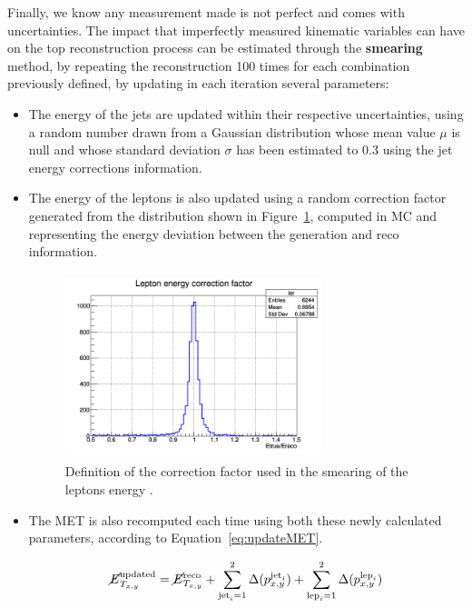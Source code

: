 \documentclass[a4paper, 10pt, openright]{report}
\begin{document}
Finally, we know any measurement made is not perfect and comes with uncertainties. The impact that imperfectly measured kinematic variables can have on the top reconstruction process can be estimated through the \textbf{smearing} method, by repeating the reconstruction 100 times for each combination previously defined, by updating in each iteration several parameters:
\begin{itemize}
\item The energy of the jets are updated within their respective uncertainties, using a random number drawn from a Gaussian distribution whose mean value $\mu$ is null and whose standard deviation $\sigma$ has been estimated to 0.3 using the jet energy corrections information.

\item The energy of the leptons is also updated using a random correction factor generated from the distribution shown in Figure~\ref{fig:lepsmearing}, computed in \ac{MC} and representing the energy deviation between the generation and reco information.

\begin{figure}[htbp]
\centering
\includegraphics[width=7.5cm, height=5.4cm]{figs/ler.png}
\caption{Definition of the correction factor used in the smearing of the leptons energy \cite{DESYAN}.}
\label{fig:lepsmearing}
\end{figure}

\item The \ac{MET} is also recomputed each time using both these newly calculated parameters, according to Equation~\ref{eq:updateMET}.

\begin{equation}
\label{eq:updateMET}
\cancel{E}_{T_{x,y}}^{\text{updated}} = \cancel{E}_{T_{x,y}}^{\text{reco}} + \sum_{\text{jet}_i = 1}^{2} \Delta(p_{x,y}^{\text{jet}_i}) + \sum_{\text{lep}_i = 1}^{2} \Delta(p_{x,y}^{\text{lep}_i})
\end{equation}


\end{itemize}
\end{document}
